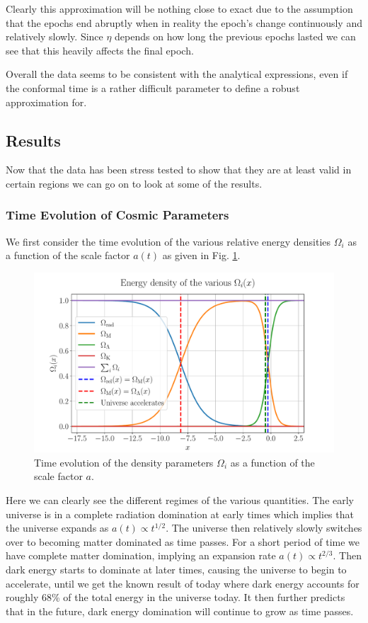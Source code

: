 \documentclass[%
reprint,
 amsmath,amssymb,
 aps,
]{revtex4-2}
\begin{document}
Clearly this approximation will be nothing close to exact due to the assumption that the epochs end abruptly when in reality the epoch's change continuously and relatively slowly. Since $\eta$ depends on how long the previous epochs lasted we can see that this heavily affects the final epoch. 

Overall the data seems to be consistent with the analytical expressions, even if the conformal time is a rather difficult parameter to define a robust approximation for.

\subsection{Results}

Now that the data has been stress tested to show that they are at least valid in certain regions we can go on to look at some of the results.
\subsubsection{Time Evolution of  Cosmic Parameters}
We first consider the time evolution of the various relative energy densities $\Omega_i$ as a function of the scale factor $a(t)$ as given in Fig. \ref{fig:Omegai}.
\begin{figure}[ht!]
	\includegraphics[width = \linewidth]{Figures/Omega_i.pdf}
	\caption{Time evolution of the density parameters $\Omega_i$ as a function of the scale factor $a$.}
	\label{fig:Omegai}
\end{figure}

Here we can clearly see the different regimes of the various quantities. The early universe is in a complete radiation domination at early times which implies that the universe expands as $a(t)\propto t^{1/2}$. The universe then relatively slowly switches over to becoming matter dominated as time passes. For a short period of time we have complete matter domination, implying an expansion rate $a(t)\propto t^{2/3}$. Then dark energy starts to dominate at later times, causing the universe to begin to accelerate, until we get the known result of today where dark energy accounts for roughly 68\% of the total energy in the universe today. It then further predicts that in the future, dark energy domination will continue to grow as time passes.
\end{document}
